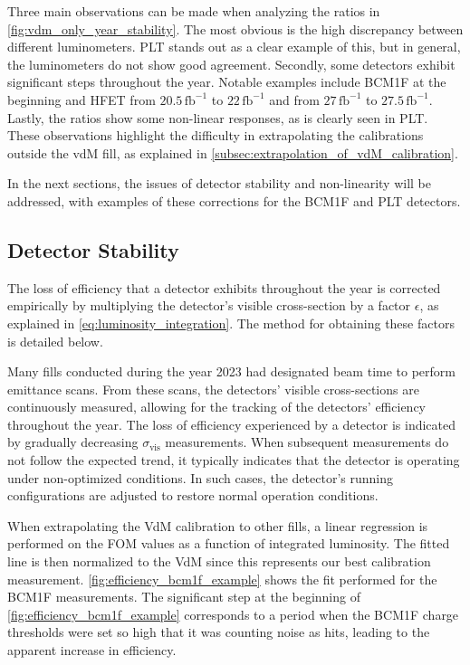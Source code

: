 Three main observations can be made when analyzing the ratios in \autoref{fig:vdm_only_year_stability}. The most obvious is the high discrepancy between different luminometers. PLT stands out as a clear example of this, but in general, the luminometers do not show good agreement. Secondly, some detectors exhibit significant steps throughout the year. Notable examples include BCM1F at the beginning and HFET from \(20.5 \, \text{fb}^{-1}\) to \(22 \, \text{fb}^{-1}\) and from \(27 \, \text{fb}^{-1}\) to \(27.5 \, \text{fb}^{-1}\). Lastly, the ratios show some non-linear responses, as is clearly seen in PLT. These observations highlight the difficulty in extrapolating the calibrations outside the vdM fill, as explained in \autoref{subsec:extrapolation_of_vdM_calibration}.

In the next sections, the issues of detector stability and non-linearity will be addressed, with examples of these corrections for the BCM1F and PLT detectors.

\subsection{Detector Stability}

The loss of efficiency that a detector exhibits throughout the year is corrected empirically by multiplying the detector's visible cross-section by a factor \(\epsilon\), as explained in \autoref{eq:luminosity_integration}. The method for obtaining these factors is detailed below.

Many fills conducted during the year 2023 had designated beam time to perform emittance scans. From these scans, the detectors' visible cross-sections are continuously measured, allowing for the tracking of the detectors' efficiency throughout the year. The loss of efficiency experienced by a detector is indicated by gradually decreasing \(\sigma_{\mathrm{vis}}\) measurements. When subsequent measurements do not follow the expected trend, it typically indicates that the detector is operating under non-optimized conditions. In such cases, the detector's running configurations are adjusted to restore normal operation conditions.

When extrapolating the VdM calibration to other fills, a linear regression is performed on the FOM values as a function of integrated luminosity. The fitted line is then normalized to the VdM since this represents our best calibration measurement. \autoref{fig:efficiency_bcm1f_example} shows the fit performed for the BCM1F measurements. The significant step at the beginning of \autoref{fig:efficiency_bcm1f_example} corresponds to a period when the BCM1F charge thresholds were set so high that it was counting noise as hits, leading to the apparent increase in efficiency.

